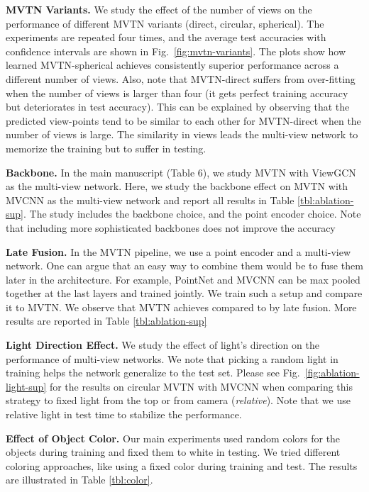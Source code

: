 \documentclass[10pt,twocolumn,letterpaper]{article}
\newcommand{\figLabel}{Fig.~}
\newcommand{\mysection}[1]{\noindent\textbf{#1.}}
\begin{document}
\mysection{MVTN Variants} \label{sec:views-supp}
We study the effect of the number of views  on the performance of different MVTN variants (direct, circular, spherical). 
The experiments are repeated four times, and the average test accuracies with confidence intervals are shown in  \figLabel{\ref{fig:mvtn-variants}}. 
 The plots show how learned MVTN-spherical achieves consistently superior performance across a different number of views. Also, note that MVTN-direct suffers from over-fitting when the number of views is larger than four (\ie it gets perfect training accuracy but deteriorates in test accuracy). This can be explained by observing that the predicted view-points tend to be similar to each other for MVTN-direct when the number of views is large. The similarity in views leads the multi-view network to memorize the training but to suffer in testing.

\mysection{Backbone}
In the main manuscript (Table 6), we study MVTN with ViewGCN as the multi-view network. Here, we study the backbone effect on MVTN with MVCNN as the multi-view network and report all results in Table \ref{tbl:ablation-sup}. The study includes the backbone choice, and the point encoder choice. Note that including more sophisticated backbones does not improve the accuracy

\mysection{Late Fusion}
In the MVTN pipeline, we use a point encoder and a multi-view network. One can argue that an easy way to combine them would be to fuse them later in the architecture. For example, PointNet \cite{pointnet} and MVCNN \cite{mvcnn} can be max pooled together at the last layers and trained jointly. We train such a setup and compare it to MVTN. We observe that  MVTN achieves  compared to  by late fusion. More results are reported in Table \ref{tbl:ablation-sup}

\mysection{Light Direction Effect}
We study the effect of light's direction on the performance of multi-view networks. We note that picking a random light in training helps the network generalize to the test set. Please see \figLabel{\ref{fig:ablation-light-sup}} for the results on circular MVTN with MVCNN when comparing this strategy to fixed light from the top or from camera (\textit{relative}). Note that we use relative light in test time to stabilize the performance.

\mysection{Effect of Object Color}
Our main experiments used random colors for the objects during training and fixed them to white in testing. We tried different coloring approaches, like using a fixed color during training and test. The results are illustrated in Table \ref{tbl:color}. 
\end{document}

